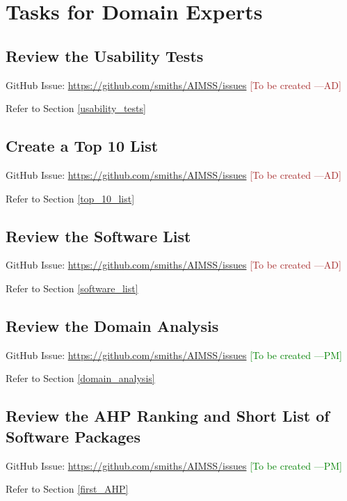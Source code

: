 \documentclass[12pt]{article}
\newcommand{\authornote}[3]{\textcolor{#1}{[#3 ---#2]}}
\newcommand{\authornote}[3]{}
\newcommand{\pmi}[1]{\authornote{green}{PM}{#1}} %
\newcommand{\ad}[1]{\authornote{brown}{AD}{#1}} %
\begin{document}
\newpage

\section{Tasks for Domain Experts}
\label{tasks_domain_experts}

\subsection{Review the Usability Tests}
\label{task_usability_tests}
GitHub Issue:
\href{https://github.com/smiths/AIMSS/issues}{https://github.com/smiths/AIMSS/issues}
\ad{To be created}

\noindent Refer to Section \ref{usability_tests}

\subsection{Create a Top 10 List}
\label{task_top_10_list}
GitHub Issue:
\href{https://github.com/smiths/AIMSS/issues}{https://github.com/smiths/AIMSS/issues}
\ad{To be created}

\noindent Refer to Section \ref{top_10_list}

\subsection{Review the Software List}
\label{task_software_list}
GitHub Issue:
\href{https://github.com/smiths/AIMSS/issues}{https://github.com/smiths/AIMSS/issues}
\ad{To be created}

\noindent Refer to Section \ref{software_list}

\subsection{Review the Domain Analysis}
GitHub Issue:
\href{https://github.com/smiths/AIMSS/issues}{https://github.com/smiths/AIMSS/issues}
\pmi{To be created}

\noindent Refer to Section \ref{domain_analysis}

\subsection{Review the AHP Ranking and Short List of Software Packages}
GitHub Issue:
\href{https://github.com/smiths/AIMSS/issues}{https://github.com/smiths/AIMSS/issues}
\pmi{To be created}

\noindent Refer to Section \ref{first_AHP}
\end{document}

